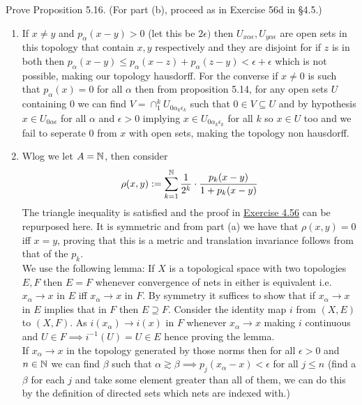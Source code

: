 \documentclass[12pt,a4paper]{article}
\begin{document}
\begin{problem}\label{prob:5-43}
Prove Proposition 5.16. (For part (b), proceed as in Exercise 56d in \S4.5.)
\end{problem}
\begin{solution}
    \begin{enumerate}[label=\alph*.]
        \item If $x\neq y$ and $p_\alpha(x-y)>0$ (let this be $2\epsilon)$ then $U_{x\alpha\epsilon},U_{y\alpha\epsilon}$ are open sets in this topology that contain $x,y$ respectively and they are disjoint for if $z$ is in both then $p_\alpha(x-y)\leq p_\alpha(x-z)+p_\alpha(z-y)<\epsilon+\epsilon$ which is not possible, making our topology hausdorff. 
            For the converse if $x\neq 0$ is such that $p_\alpha(x)=0$ for all $\alpha$ then from proposition 5.14, for any open sets $U$ containing $0$ we can find $V=\cap_1^kU_{0\alpha_k\epsilon_k}$ such that $0\in V \subseteq U$ and by hypothesis $x\in U_{0\alpha\epsilon}$ for all $\alpha$ and $\epsilon>0$ implying $x\in U_{0\alpha_k\epsilon_k}$ for all $k$ so $x\in U$ too and we fail to seperate $0$ from $x$ with open sets, making the topology non hausdorff. 
        \item Wlog we let $A=\mathbb{N}$, then consider
            \[
                \rho(x,y):=\sum_{k=1}^{\mathbb{N}} \frac{1}{2^k}\cdot \frac{p_k(x-y)}{1+p_k(x-y)}
            \]
            The triangle inequality is satisfied and the proof in \hyperref[prob:4-56]{Exercise 4.56} can be repurposed here. 
            It is symmetric and from part (a) we have that $\rho(x,y)=0$ iff $x=y$, proving that this is a metric and translation invariance follows from that of the $p_k.$  
            \\
            We use the following lemma: If $X$ is a topological space with two topologies $E,F$ then $E=F$ whenever convergence of nets in either is equivalent i.e. $x_\alpha\to x$ in $E$ iff $x_\alpha\to x$ in $F.$ 
            By symmetry it suffices to show that if $x_\alpha\to x$ in $E$ implies that in $F$ then $E \supseteq F.$ 
            Consider the identity map $i$ from $(X,E)$ to $(X,F)$. 
            As $i(x_\alpha)\to i(x)$ in $F$ whenever $x_\alpha\to x$ making $i$ continuous and $U\in F\implies i^{-1}(U)=U\in E$ hence proving the lemma. 
            \\
            If $x_\alpha\to x$ in the topology generated by those norms then for all $\epsilon>0$ and $n\in\mathbb{N}$ we can find $\beta$ such that $\alpha\gtrsim\beta\implies p_j(x_\alpha-x)<\epsilon$ for all $j\leq n$ (find a $\beta$ for each $j$ and take some element greater than all of them, we can do this by the definition of directed sets which nets are indexed with.) 

\end{enumerate}
\end{solution}
\end{document}

